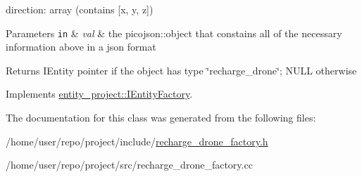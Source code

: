 direction\+: array (contains \mbox{[}x, y, z\mbox{]})


\begin{DoxyParams}[1]{Parameters}
\mbox{\tt in}  & {\em val} & the picojson\+::object that constains all of the necessary information above in a json format \\
\hline
\end{DoxyParams}
\begin{DoxyReturn}{Returns}
I\+Entity pointer if the object has type \char`\"{}recharge\+\_\+drone\char`\"{}; N\+U\+LL otherwise 
\end{DoxyReturn}


Implements \hyperlink{classentity__project_1_1IEntityFactory_ac4e8eaf4294958fef0b98bd3684704bb}{entity\+\_\+project\+::\+I\+Entity\+Factory}.



The documentation for this class was generated from the following files\+:\begin{DoxyCompactItemize}
\item 
/home/user/repo/project/include/\hyperlink{recharge__drone__factory_8h}{recharge\+\_\+drone\+\_\+factory.\+h}\item 
/home/user/repo/project/src/recharge\+\_\+drone\+\_\+factory.\+cc\end{DoxyCompactItemize}
